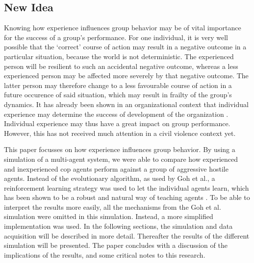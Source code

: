 \subsection{New Idea}
Knowing how experience influences group behavior may be of vital importance for the success of a group's performance.
For one individual, it is very well possible that the `correct' course of action may result in a negative outcome in a particular situation, because the world is not deterministic.
The experienced person will be resilient to such an accidental negative outcome, whereas a less experienced person may be affected more severely by that negative outcome.
The latter person may therefore change to a less favourable course of action in a future occurence of said situation, which may result in frailty of the group's dynamics.
It has already been shown in an organizational context that individual experience may determine the success of development of the organization \citep*{reagans2005individual}.
Individual experience may thus have a great impact on group performance.
However, this has not received much attention in a civil violence context yet.

This paper focusses on how experience influences group behavior.
 By using a simulation of a multi-agent system, we were able to compare how experienced and inexperienced cop agents perform against a group of aggressive hostile agents. Instead of the evolutionary algorithm, as used by Goh et al., a reinforcement learning strategy was used to let the individual agents learn, which has been shown to be a robust and natural way of teaching agents \citep{claus1998dynamics}. To be able to interpret the results more easily, all the mechanisms from the Goh et al. simulation were omitted in this simulation. Instead, a more simplified implementation was used. In the following sections, the simulation and data acquisition will be described in more detail.
 Thereafter the results of the different simulation will be presented.
 The paper concludes with a discussion of the implications of the results, and some critical notes to this research.
 
